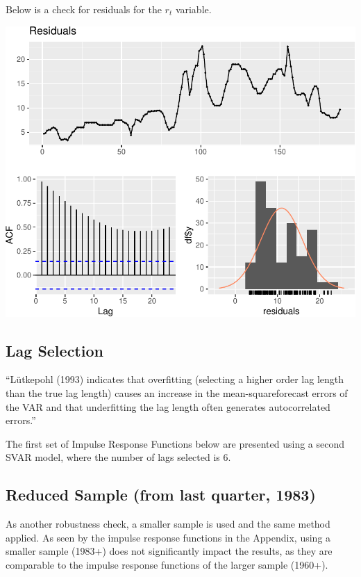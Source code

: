 \documentclass[11pt,preprint, authoryear]{elsarticle}
\numberwithin{equation}{section}
\numberwithin{figure}{section}
\numberwithin{table}{section}
\begin{document}
Below is a check for residuals for the \(r_t\) variable.

\includegraphics{TS_proj_files/figure-latex/unnamed-chunk-24-1.pdf}

\hypertarget{lag-selection}{%
\subsection{Lag Selection}\label{lag-selection}}

``Lütkepohl (1993) indicates that overfitting (selecting a higher order
lag length than the true lag length) causes an increase in the
mean-squareforecast errors of the VAR and that underfitting the lag
length often generates autocorrelated errors.''

The first set of Impulse Response Functions below are presented using a
second SVAR model, where the number of lags selected is 6.

\hypertarget{reduced-sample-from-last-quarter-1983}{%
\subsection{Reduced Sample (from last quarter,
1983)}\label{reduced-sample-from-last-quarter-1983}}

As another robustness check, a smaller sample is used and the same
method applied. As seen by the impulse response functions in the
Appendix, using a smaller sample (1983+) does not significantly impact
the results, as they are comparable to the impulse response functions of
the larger sample (1960+).
\end{document}
